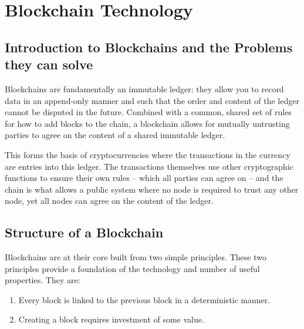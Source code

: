 
\chapter{Blockchain Technology}
\label{ch:blockchain}

\section{Introduction to Blockchains and the Problems they can solve}
\label{ch:blockchain:intro}

Blockchains are fundamentally an immutable ledger: they allow you to record data in an append-only manner and such that the order and content of the ledger cannot be disputed in the future. Combined with a common, shared set of rules for how to add blocks to the chain, a blockchain allows for mutually untrusting parties to agree on the content of a shared immutable ledger.

This forms the basis of cryptocurrencies where the transactions in the currency are entries into this ledger. The transactions themselves use other cryptographic functions to ensure their own rules -- which all parties can agree on -- and the chain is what allows a public system where no node is required to trust any other node, yet all nodes can agree on the content of the ledger.




\section{Structure of a Blockchain}
\label{ch:blockchain:structure}

Blockchains are at their core built from two simple principles. These two principles provide a foundation of the technology and number of useful properties. They are:

\begin{enumerate}
    \item Every block is linked to the previous block in a deterministic manner.
    \item Creating a block requires investment of some value.
\end{enumerate}

